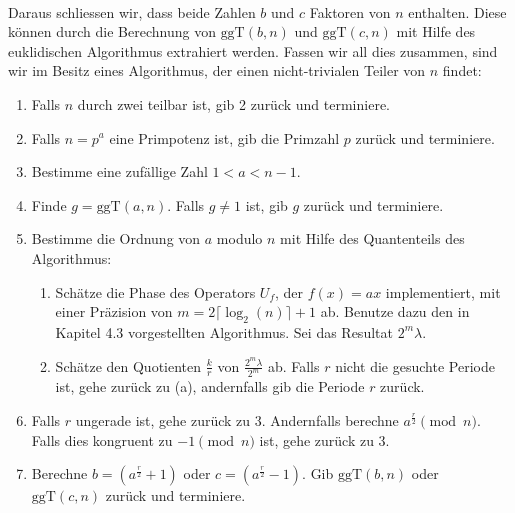 \paragraph{}
Daraus schliessen wir, dass beide Zahlen $b$ und $c$ Faktoren von $n$ enthalten. Diese können durch die Berechnung von $\text{ggT}(b, n)$ und $\text{ggT}(c, n)$ mit Hilfe des euklidischen Algorithmus extrahiert werden. Fassen wir all dies zusammen, sind wir im Besitz eines Algorithmus, der einen nicht-trivialen Teiler von $n$ findet:
\begin{enumerate}
    \item Falls $n$ durch zwei teilbar ist, gib 2 zurück und terminiere.
    \item Falls $n = p^a$ eine Primpotenz ist, gib die Primzahl $p$ zurück und terminiere.
    \item Bestimme eine zufällige Zahl $1 < a < n - 1$.
    \item Finde $g = \text{ggT}(a, n)$. Falls $g \neq 1$ ist, gib $g$ zurück und terminiere.
    \item Bestimme die Ordnung von $a$ modulo $n$ mit Hilfe des Quantenteils des Algorithmus:
    \begin{enumerate}
        \item Schätze die Phase des Operators $U_f$, der $f(x) = ax$ implementiert, mit einer Präzision von $m = 2\lceil \log_2(n) \rceil + 1$ ab. Benutze dazu den in Kapitel 4.3 vorgestellten Algorithmus. Sei das Resultat $2^m\lambda$.
        \item Schätze den Quotienten $\frac{k}{r}$ von $\frac{2^m\lambda}{2^m}$ ab. Falls $r$ nicht die gesuchte Periode ist, gehe zurück zu (a), andernfalls gib die Periode $r$ zurück.
    \end{enumerate}
    \item Falls $r$ ungerade ist, gehe zurück zu 3. Andernfalls berechne $a^{\frac{r}{2}} \pmod{n}$. Falls dies kongruent zu $-1 \pmod{n}$ ist, gehe zurück zu 3.
    \item Berechne $b = (a^\frac{r}{2} + 1)$ oder $c = (a^\frac{r}{2} - 1)$. Gib $\text{ggT}(b, n)$ oder $\text{ggT}(c, n)$ zurück und terminiere.
\end{enumerate}
